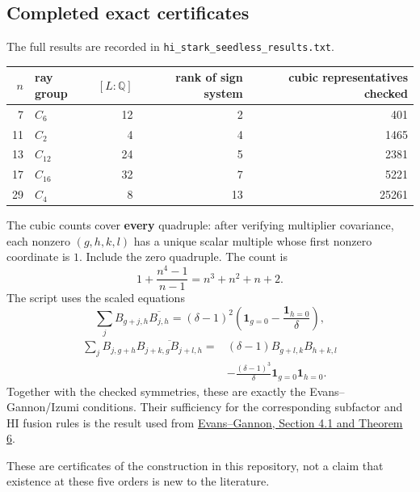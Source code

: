 \documentclass[11pt,reqno]{amsart}
\theoremstyle{plain}
\begin{document}
\subsection{Completed exact certificates}\label{sec:29.1}

The full results are recorded in
\texttt{hi\_\allowbreak stark\_\allowbreak seedless\_\allowbreak results.txt}.

\begin{center}\small
\begin{tabular}{@{}rlrrr@{}}
\toprule
\(n\) & ray group & \([L:\mathbb Q]\) & rank of sign system & cubic representatives checked \\
\midrule
7 & \(C_6\) & 12 & 2 & 401 \\
11 & \(C_2\) & 4 & 4 & 1465 \\
13 & \(C_{12}\) & 24 & 5 & 2381 \\
17 & \(C_{16}\) & 32 & 7 & 5221 \\
29 & \(C_4\) & 8 & 13 & 25261 \\
\bottomrule
\end{tabular}
\end{center}

The cubic counts cover \textbf{every} quadruple: after verifying multiplier
covariance, each nonzero \((g,h,k,l)\) has a unique scalar multiple
whose first nonzero coordinate is \(1\). Include the zero quadruple.
The count is
\[
 1+\frac{n^4-1}{n-1}=n^3+n^2+n+2.
\]
The script uses the scaled equations
\begin{equation*}
 \sum_j B_{g+j,h}\overline{B_{j,h}}
 = (\delta-1)^2\left(\mathbf1_{g=0}-\frac{\mathbf1_{h=0}}\delta\right),
 \tag{29.2}
\end{equation*}
\begin{equation*}
 \begin{split}
 \sum_j B_{j,g+h}\overline{B_{j+k,g}B_{j+l,h}}
 ={}&(\delta-1)B_{g+l,k}B_{h+k,l}\\
 &-\frac{(\delta-1)^3}{\delta}\mathbf1_{g=0}\mathbf1_{h=0}.
 \end{split}
 \tag{29.3}
\end{equation*}
Together with the checked symmetries, these are exactly the
Evans--Gannon/Izumi conditions. Their sufficiency for the corresponding
subfactor and HI fusion rules is the result used from
\href{https://arxiv.org/html/1006.1326\#S4}{Evans--Gannon, Section 4.1 and Theorem 6}.

These are certificates of the construction in this repository, not a
claim that existence at these five orders is new to the literature.
\end{document}
